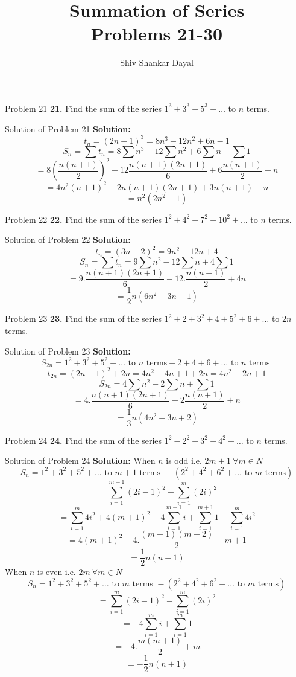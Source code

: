 \documentclass[aspectratio=1610,8pt]{beamer}
\title{Summation of Series\\Problems 21-30}
\author[Shiv Shankar Dayal]{Shiv Shankar Dayal}
\begin{document}
\begin{frame}
  \titlepage
\end{frame}
\begin{frame}{Problem 21}
  \textbf{21.} Find the sum of the series $1^3 + 3^3 + 5^3 + \ldots$ to $n$ terms.
\end{frame}
\begin{frame}{Solution of Problem 21}
  \textbf{Solution:} $$t_n = (2n - 1)^3 = 8n^3 -12n^2 + 6n - 1$$
  $$S_n = \sum t_n = 8\sum n^3 -12\sum n^2 + 6\sum n - \sum 1$$
  $$= 8\left(\frac{n(n + 1)}{2}\right)^2 - 12\frac{n(n + 1)(2n + 1)}{6} + 6\frac{n(n + 1)}{2} - n$$
  $$= 4n^2(n + 1)^2 - 2n(n + 1)(2n + 1) + 3n(n + 1) - n$$
  $$= n^2(2n^2 - 1)$$
\end{frame}
\begin{frame}{Problem 22}
  \textbf{22.} Find the sum of the series $1^2 + 4^2 + 7^2 + 10^2 + \ldots$ to $n$ terms.
\end{frame}
\begin{frame}{Solution of Problem 22}
  \textbf{Solution:} $$t_n = (3n - 2)^2 = 9n^2 -12n + 4$$
  $$S_n = \sum t_n = 9\sum n^2 - 12\sum n + 4\sum 1$$
  $$= 9.\frac{n(n + 1)(2n + 1)}{6} - 12.\frac{n(n + 1)}{2} + 4n$$
  $$= \frac{1}{2}n(6n^2 - 3n - 1)$$
\end{frame}
\begin{frame}{Problem 23}
  \textbf{23.} Find the sum of the series $1^2 + 2 + 3^2 + 4 + 5^2 + 6 + \ldots$ to $2n$ terms.
\end{frame}
\begin{frame}{Solution of Problem 23}
  \textbf{Solution:}$$S_{2n} = 1^2 + 3^2 + 5^2 + \ldots\text{~to~}n\text{~terms}+ 2 + 4 + 6 + \ldots\text{~to~}n\text{~terms~}$$
  $$t_{2n} = (2n - 1)^2 + 2n = 4n^2 -4n + 1 + 2n = 4n^2 - 2n + 1$$
  $$S_{2n} = 4\sum n^2 -2\sum n +\sum 1$$
  $$= 4.\frac{n(n + 1)(2n + 1)}{6} -2\frac{n(n + 1)}{2} + n$$
  $$= \frac{1}{3}n(4n^2 + 3n + 2)$$
\end{frame}
\begin{frame}{Problem 24}
  \textbf{24.} Find the sum of the series $1^2 - 2^2 + 3^2 - 4^2 + \ldots$ to $n$ terms.
\end{frame}
\begin{frame}{Solution of Problem 24}
  \textbf{Solution:} When $n$ is odd i.e. $2m + 1~\forall m\in N$
  $$S_n = 1^2 + 3^2 + 5^2 + \ldots \text{~to~}m + 1\text{~terms~} - (2^2 + 4^2 + 6^2 + \ldots\text{~to~}m\text{~terms})$$
  $$= \sum_{i = 1}^{m + 1} (2i - 1)^2 - \sum_{i=1}^{m} (2i)^2$$
  $$= \sum_{i = 1}^m4i^2 + 4(m + 1)^2 - 4\sum_{i = 1}^{m + 1}i + \sum_{i = 1}^{m + 1}1 -  \sum_{i=1}^{m} 4i^2$$
  $$= 4(m + 1)^2 -4.\frac{(m + 1)(m + 2)}{2} + m + 1$$
  $$= \frac{1}{2}n(n + 1)$$
  When $n$ is even i.e. $2m~\forall m \in N$
  $$S_n = 1^2 + 3^2 + 5^2 + \ldots \text{~to~}m\text{~terms~} - (2^2 + 4^2 + 6^2 + \ldots\text{~to~}m\text{~terms})$$
  $$= \sum_{i = 1}^m (2i - 1)^2 - \sum_{i=1}^m (2i)^2$$
  $$= -4\sum_{i= 1}^mi + \sum_{i=1}^m 1$$
  $$= -4.\frac{m(m + 1)}{2} + m$$
  $$= -\frac{1}{2}n(n + 1)$$
\end{frame}
\end{document}
